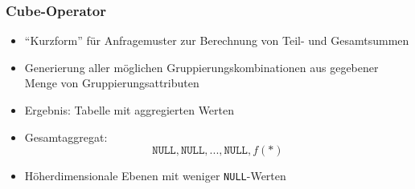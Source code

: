     \begin{frame}
    \frametitle{Cube-Operator}
    \begin{itemize}
    \item "`Kurzform"' für Anfragemuster zur Berechnung von Teil- und
      Gesamtsummen
    \item Generierung aller möglichen Gruppierungskombinationen aus
      gegebener Menge von Gruppierungsattributen
    \item Ergebnis: Tabelle mit aggregierten Werten
    \item Gesamtaggregat:
      $$
      \texttt{NULL}, \texttt{NULL}, ..., \texttt{NULL}, f(*)
      $$
    \item Höherdimensionale Ebenen mit weniger \texttt{NULL}-Werten
    \end{itemize}
    
    \end{frame}
    
    
